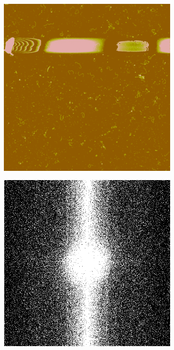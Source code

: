 \documentclass{article}
\begin{document}
\begin{figure}[H]
	\begin{subfigure}[b]{0.32\textwidth}
		\includegraphics[width=\linewidth]{step1}
		\caption{}
		\label{fig:step1lpf }
	\end{subfigure}%
	\hspace{\fill}
	\begin{subfigure}[b]{0.32\textwidth}
		\includegraphics[width=\linewidth]{step2}

\end{subfigure}
\end{figure}
\end{document}
